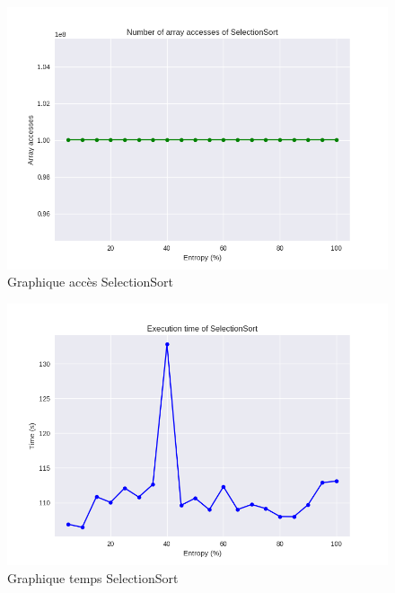 \documentclass[10pt,a4paper]{article}
\begin{document}
            \begin{figure}
                \centering
                \includegraphics[width=1\textwidth]{graphique/SelectionSort/GraphAccessesSelectionSort.png}
                \caption{Graphique accès SelectionSort}
                \label{fig:mesh1}
            \end{figure}
            \begin{figure}
                \centering
                \includegraphics[width=1\textwidth]{graphique/SelectionSort/GraphTimeSelectionSort.png}
                \caption{Graphique temps SelectionSort}
                \label{fig:mesh1}
            \end{figure}
\end{document}
